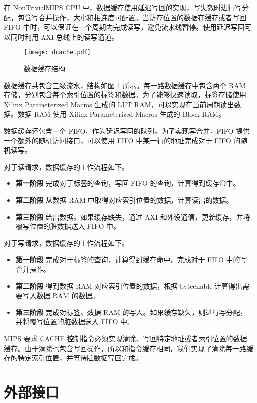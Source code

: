 在 NonTrivialMIPS CPU 中，数据缓存使用延迟写回的实现，写失效时进行写分配，包含写合并操作，大小和相连度可配置。当访存位置的数据在缓存或者写回 FIFO 中时，可以保证在一个周期内完成读写，避免流水线暂停。使用延迟写回可以同时利用 AXI 总线上的读写通道。

\begin{figure}[htbp]
	\centering
	\texttt{[image: dcache.pdf]}
	\caption{数据缓存结构}
	\label{fig:dcache-structure}
\end{figure}

数据缓存共包含三级流水，结构如图 \ref{fig:dcache-structure} 所示。每一路数据缓存中包含两个 RAM 存储，分别包含每个索引位置的标签和数据。为了能够快速读取，标签存储使用 Xilinx Parameterized Macros 生成的 LUT RAM，可以实现在当前周期读出数据。数据 RAM 使用 Xilinx Parameterized Macros 生成的 Block RAM。

数据缓存还包含一个 FIFO，作为延迟写回的队列。为了实现写合并，FIFO 提供一个额外的随机访问接口，可以使用 FIFO 中某一行的地址完成对于 FIFO 的随机读写。

对于读请求，数据缓存的工作流程如下。
\begin{itemize}
  \item \textbf{第一阶段} 完成对于标签的查询，写回 FIFO 的查询，计算得到缓存命中。
  \item \textbf{第二阶段} 从数据 RAM 中取得对应索引位置的数据，计算读出的数据。
  \item \textbf{第三阶段} 给出数据。如果缓存缺失，通过 AXI 和外设通信，更新缓存，并将覆写位置的脏数据送入 FIFO 中。
\end{itemize}

对于写请求，数据缓存的工作流程如下。
\begin{itemize}
  \item \textbf{第一阶段} 完成对于标签的查询，计算得到缓存命中，完成对于 FIFO 中的写合并操作。
  \item \textbf{第二阶段} 得到数据 RAM 对应索引位置的数据，根据 byteenable 计算得出需要写入数据 RAM 的数据。
  \item \textbf{第三阶段} 完成对标签、数据 RAM 的写入。如果缓存缺失，则进行写分配，并将覆写位置的脏数据送入 FIFO 中。
\end{itemize}

MIPS 要求 CACHE 控制指令必须实现清除、写回特定地址或者索引位置的数据缓存。由于清除也包含写回操作，所以和指令缓存相同，我们实现了清除每一路缓存的特定索引位置，并等待脏数据写回完成。


\section{外部接口}

